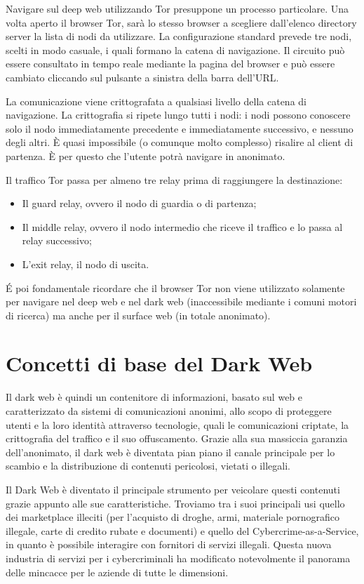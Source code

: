 Navigare sul deep web utilizzando Tor presuppone un processo particolare. Una volta aperto il browser Tor, sarà lo stesso browser a scegliere dall’elenco directory server la lista di nodi da utilizzare. La configurazione standard prevede tre nodi, scelti in modo casuale, i quali formano la catena di navigazione. Il circuito può essere consultato in tempo reale mediante la pagina del browser e può essere cambiato cliccando sul pulsante a sinistra della barra dell’URL. 

La comunicazione viene crittografata a qualsiasi livello della catena di navigazione. La crittografia si ripete lungo tutti i nodi: i nodi possono conoscere solo il nodo immediatamente precedente e immediatamente successivo, e nessuno degli altri. È quasi impossibile (o comunque molto complesso) risalire al client di partenza. È per questo che l’utente potrà navigare in anonimato. 

Il traffico Tor passa per almeno tre relay prima di raggiungere la destinazione: 

\begin{itemize}
\item Il guard relay, ovvero il nodo di guardia o di partenza;
\item Il middle relay, ovvero il nodo intermedio che riceve il traffico e lo passa al relay successivo;
\item L’exit relay, il nodo di uscita.
\end{itemize}


\'E poi fondamentale ricordare che il browser Tor non viene utilizzato solamente per navigare nel deep web e nel dark web (inaccessibile mediante i comuni motori di ricerca) ma anche per il surface web (in totale anonimato).

\section{Concetti di base del Dark Web}\label{sec:cap_sec_darkweb2}

Il dark web è quindi un contenitore di informazioni, basato sul web e caratterizzato da sistemi di comunicazioni anonimi, allo scopo di proteggere utenti e la loro identità attraverso tecnologie, quali le comunicazioni criptate, la crittografia del traffico e il suo offuscamento.
Grazie alla sua massiccia garanzia dell'anonimato, il dark web è diventata pian piano il canale principale per lo scambio e la distribuzione di contenuti pericolosi, vietati o illegali.

Il Dark Web è diventato il principale strumento per veicolare questi contenuti grazie appunto alle sue caratteristiche. Troviamo tra i suoi principali usi quello dei marketplace illeciti (per l'acquisto di droghe, armi, materiale pornografico illegale, carte di credito rubate e documenti) e quello del Cybercrime-as-a-Service, in quanto è possibile interagire con fornitori di servizi illegali. Questa nuova industria di servizi per i cybercriminali ha modificato notevolmente il panorama delle mincacce per le aziende di tutte le dimensioni. 

